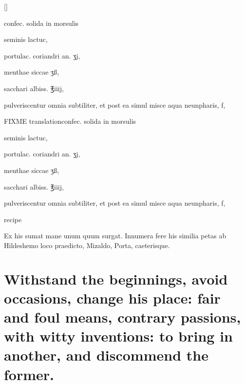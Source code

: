 {\begin{Prescription}[H]
[\baselineskip]
\begin{prescriptionbox}{}{\textlatin{confec. solida in morsulis}}
\item \textlatin{seminis lactuc},
\item \textlatin{portulac. coriandri an. ʒj},
\item \textlatin{menthae siccae ʒß},
\item \textlatin{sacchari albiss. ℥iiij},
\item \textlatin{pulveriscentur omnia subtiliter, et post ea simul misce aqua neunpharis, f},
\end{prescriptionbox}
\begin{prescriptionbox}{FIXME translation}{\textlatin{confec. solida in morsulis}}
\item \textlatin{seminis lactuc},
\item \textlatin{portulac. coriandri an. ʒj},
\item \textlatin{menthae siccae ʒß},
\item \textlatin{sacchari albiss. ℥iiij},
\item \textlatin{pulveriscentur omnia subtiliter, et post ea simul misce aqua neunpharis, f},
\end{prescriptionbox}
\caption{ recipe}
\end{Prescription}

Ex his sumat mane unum quum
surgat. Innumera fere his similia petas ab Hildeshemo loco praedicto,
Mizaldo, Porta, caeterisque.

\section[Withstand the beginnings, avoid occasions of love]{Withstand the beginnings, avoid occasions, change his place: fair and foul means, contrary passions, with witty inventions: to bring in another, and discommend the former.}

}
